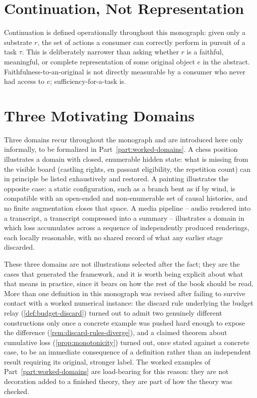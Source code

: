 \section{Continuation, Not Representation}

Continuation is defined operationally throughout this monograph: given
only a substrate $r$, the set of actions a consumer can correctly
perform in pursuit of a task $\tau$. This is deliberately narrower than
asking whether $r$ is a faithful, meaningful, or complete representation
of some original object $e$ in the abstract. Faithfulness-to-an-original
is not directly measurable by a consumer who never had access to $e$;
sufficiency-for-a-task is.

\section{Three Motivating Domains}

Three domains recur throughout the monograph and are introduced here
only informally, to be formalized in Part~\ref{part:worked-domains}. A
chess position illustrates a domain with closed, enumerable hidden
state: what is missing from the visible board (castling rights, en
passant eligibility, the repetition count) can in principle be listed
exhaustively and restored. A painting illustrates the opposite case: a
static configuration, such as a branch bent as if by wind, is compatible
with an open-ended and non-enumerable set of causal histories, and no
finite augmentation closes that space. A media pipeline -- audio
rendered into a transcript, a transcript compressed into a summary --
illustrates a domain in which loss accumulates across a sequence of
independently produced renderings, each locally reasonable, with no
shared record of what any earlier stage discarded.

These three domains are not illustrations selected after the fact; they
are the cases that generated the framework, and it is worth being
explicit about what that means in practice, since it bears on how the
rest of the book should be read. More than one definition in this
monograph was revised after failing to survive contact with a worked
numerical instance: the discard rule underlying the budget relay
(\cref{def:budget-discard}) turned out to admit two genuinely different
constructions only once a concrete example was pushed hard enough to
expose the difference (\cref{rem:discard-rules-diverge}), and a claimed
theorem about cumulative loss (\cref{prop:monotonicity}) turned out, once
stated against a concrete case, to be an immediate consequence of a
definition rather than an independent result requiring its original,
stronger label. The worked examples of Part~\ref{part:worked-domains}
are load-bearing for this reason: they are not decoration added to a
finished theory, they are part of how the theory was checked.

